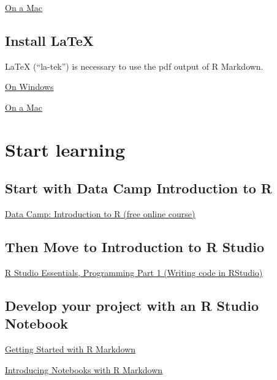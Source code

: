 \documentclass[]{book}
\begin{document}
\href{https://medium.com/@GalarnykMichael/install-r-and-rstudio-on-mac-e911606ce4f4}{On
a Mac}

\subsection{Install LaTeX}\label{install-latex}

LaTeX (``la-tek'') is necessary to use the pdf output of R Markdown.

\href{https://medium.com/@sorenlind/create-pdf-reports-using-r-r-markdown-latex-and-knitr-on-windows-10-952b0c48bfa9}{On
Windows}

\href{https://medium.com/@sorenlind/create-pdf-reports-using-r-r-markdown-latex-and-knitr-on-macos-high-sierra-e7b5705c9fd}{On
a Mac}

\section{Start learning}\label{start-learning}

\subsection{Start with Data Camp Introduction to
R}\label{start-with-data-camp-introduction-to-r}

\href{https://www.datacamp.com/courses/free-introduction-to-r}{Data
Camp: Introduction to R (free online course)}

\subsection{Then Move to Introduction to R
Studio}\label{then-move-to-introduction-to-r-studio}

\href{https://www.rstudio.com/resources/webinars/rstudio-essentials-webinar-series-part-1/}{R
Studio Essentials, Programming Part 1 (Writing code in RStudio)}

\subsection{Develop your project with an R Studio
Notebook}\label{develop-your-project-with-an-r-studio-notebook}

\href{https://www.rstudio.com/resources/webinars/getting-started-with-r-markdown/}{Getting
Started with R Markdown}

\href{https://www.rstudio.com/resources/webinars/introducing-notebooks-with-r-markdown/}{Introducing
Notebooks with R Markdown}
\end{document}
